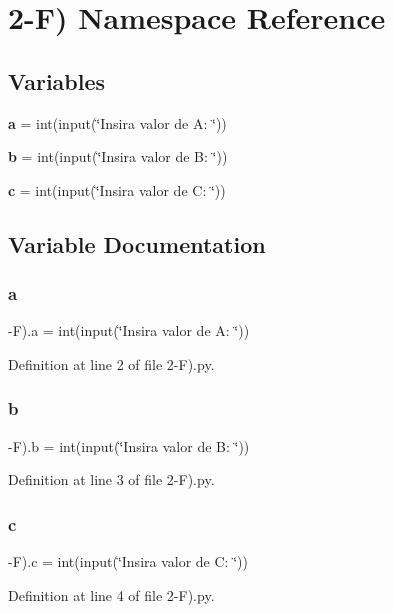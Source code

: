 \section{2-\/F) Namespace Reference}
\label{namespace2-_f_08}
\subsection*{Variables}
\begin{DoxyCompactItemize}
\item 
\textbf{ a} = int(input(\char`\"{}Insira valor de A\+: \char`\"{}))
\item 
\textbf{ b} = int(input(\char`\"{}Insira valor de B\+: \char`\"{}))
\item 
\textbf{ c} = int(input(\char`\"{}Insira valor de C\+: \char`\"{}))
\end{DoxyCompactItemize}


\subsection{Variable Documentation}
\mbox{\label{namespace2-_f_08_acee9e5094b153bcc7921f2e069775fd4}} 
\subsubsection{a}
{\footnotesize{}-\/F).a = int(input(\char`\"{}Insira valor de A\+: \char`\"{}))}



Definition at line 2 of file 2-\/\+F).\+py.

\mbox{\label{namespace2-_f_08_accc81bc44e8a1bd3addff7ab2f381882}} 
\subsubsection{b}
{\footnotesize{}-\/F).b = int(input(\char`\"{}Insira valor de B\+: \char`\"{}))}



Definition at line 3 of file 2-\/\+F).\+py.

\mbox{\label{namespace2-_f_08_a94dc1f2464995070f425176961f0d890}} 
\subsubsection{c}
{\footnotesize{}-\/F).c = int(input(\char`\"{}Insira valor de C\+: \char`\"{}))}



Definition at line 4 of file 2-\/\+F).\+py.

